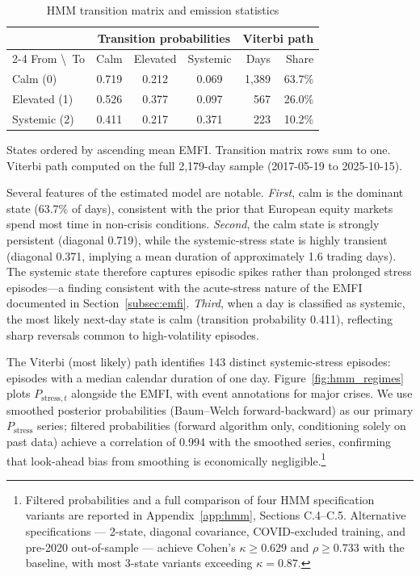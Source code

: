 \documentclass[11pt]{article}
\begin{document}
\begin{table}[ht]
\centering
\caption{HMM transition matrix and emission statistics}
\label{tab:hmm_params}
\begin{threeparttable}
\small
\begin{tabular}{lccc|rr}
\toprule
 & \multicolumn{3}{c|}{Transition probabilities} & \multicolumn{2}{c}{Viterbi path} \\
\cmidrule{2-4}
From \textbackslash\ To & Calm & Elevated & Systemic & Days & Share \\
\midrule
Calm (0)     & 0.719 & 0.212 & 0.069 & 1,389 & 63.7\% \\
Elevated (1) & 0.526 & 0.377 & 0.097 & 567   & 26.0\% \\
Systemic (2) & 0.411 & 0.217 & 0.371 & 223   & 10.2\% \\
\bottomrule
\end{tabular}
\begin{tablenotes}
\small
\item States ordered by ascending mean EMFI. Transition matrix rows sum to one.
      Viterbi path computed on the full 2,179-day sample (2017-05-19 to 2025-10-15).
\end{tablenotes}
\end{threeparttable}
\end{table}

Several features of the estimated model are notable.
\emph{First}, calm is the dominant state (63.7\% of days), consistent with
the prior that European equity markets spend most time in non-crisis conditions.
\emph{Second}, the calm state is strongly persistent (diagonal 0.719), while
the systemic-stress state is highly transient (diagonal 0.371, implying a
mean duration of approximately 1.6 trading days).
The systemic state therefore captures episodic spikes rather than prolonged
stress episodes---a finding consistent with the acute-stress nature of the
EMFI documented in Section~\ref{subsec:emfi}.
\emph{Third}, when a day is classified as systemic, the most likely
next-day state is calm (transition probability 0.411), reflecting sharp
reversals common to high-volatility episodes.

The Viterbi (most likely) path identifies 143 distinct systemic-stress episodes:
episodes with a median calendar duration of one day.
Figure~\ref{fig:hmm_regimes} plots $P_{\text{stress},t}$ alongside the EMFI,
with event annotations for major crises.
We use smoothed posterior probabilities (Baum--Welch forward-backward) as our
primary $P_{\text{stress}}$ series; filtered probabilities (forward algorithm
only, conditioning solely on past data) achieve a correlation of 0.994 with
the smoothed series, confirming that look-ahead bias from smoothing is
economically negligible.\footnote{Filtered probabilities and a full comparison
of four HMM specification variants are reported in Appendix~\ref{app:hmm},
Sections C.4--C.5. Alternative specifications --- 2-state, diagonal covariance,
COVID-excluded training, and pre-2020 out-of-sample --- achieve Cohen's
$\kappa \geq 0.629$ and $\rho \geq 0.733$ with the baseline, with most
3-state variants exceeding $\kappa = 0.87$.}
\end{document}
